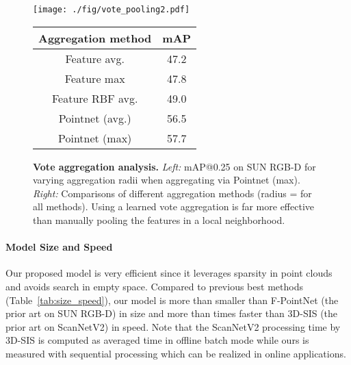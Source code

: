 \documentclass[10pt,twocolumn,letterpaper]{article}
\begin{document}
\begin{figure}[t!]
\begin{minipage}[c]{0.52\linewidth}
\begin{center}
\texttt{[image: ./fig/vote\_pooling2.pdf]}
\end{center}
\end{minipage}\begin{minipage}[c]{0.48\linewidth}
\begin{center}
{
\fontsize{8pt}{1em}\selectfont
\begin{tabular}{c|c}
\toprule
  Aggregation method & mAP \\
\midrule
Feature avg. & 47.2 \\ 
Feature max & 47.8 \\
Feature RBF avg. & 49.0 \\
\midrule
Pointnet (avg.) & 56.5 \\
Pointnet (max) & 57.7 \\
\bottomrule
\end{tabular}
}
\end{center}
\end{minipage}
\vspace{0.1in}
    \caption{\textbf{Vote aggregation analysis.} \emph{Left:} mAP@0.25 on SUN RGB-D for varying aggregation radii when aggregating via Pointnet (max). \emph{Right:} Comparisons of different aggregation methods (radius =  for all methods). Using a learned vote aggregation is far more effective than manually pooling the features in a local neighborhood.}
    \label{fig:vote_pooling}
\end{figure}


\paragraph{Model Size and Speed}
Our proposed model is very efficient since it leverages sparsity in point clouds and avoids search in empty space. Compared to previous best methods (Table~\ref{tab:size_speed}), our model is more than  smaller than F-PointNet (the prior art on SUN RGB-D) in size and more than  times faster than 3D-SIS (the prior art on ScanNetV2) in speed. Note that the ScanNetV2 processing time by 3D-SIS is computed as averaged time in offline batch mode while ours is measured with sequential processing which can be realized in online applications.
\end{document}
